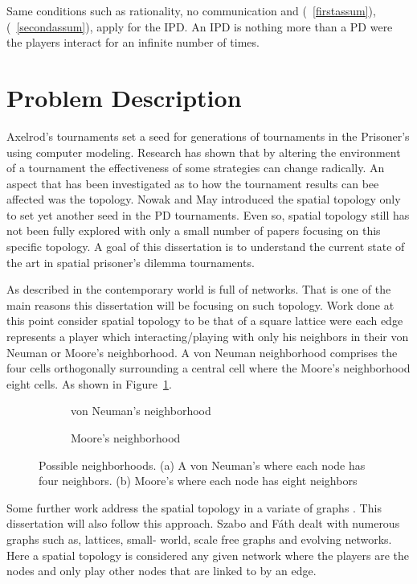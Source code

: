 Same conditions such as rationality, no communication and (~\ref{firstassum}),
(~\ref{secondassum}),
apply for the IPD. An IPD is nothing more than a PD were
the players interact for an infinite number of times.

\section{Problem Description}
Axelrod's tournaments set a seed for generations of tournaments in the
Prisoner's using computer modeling. Research has shown that by altering the
environment of a tournament the effectiveness of some strategies can change
radically. An aspect that has been investigated as to how the tournament results
can bee affected was the topology. Nowak and May \cite{Nowak1992} introduced the spatial topology
only to set yet another seed in the PD tournaments. Even so, spatial topology
still has not been fully explored with only a small number of papers focusing on
this specific topology.  A goal of this dissertation is to understand the
current state of the art in spatial prisoner’s dilemma tournaments.

As described in \cite{MacLane1971} the contemporary world is full of networks. That
is one of the main reasons this dissertation will be focusing on such topology.
Work done at this point consider spatial topology to be that of a square lattice
were each edge represents a player which interacting/playing with only his
neighbors in their von Neuman or Moore's neighborhood. A von Neuman neighborhood
comprises the four cells orthogonally surrounding a central cell where the
Moore's neighborhood eight cells. As shown in Figure~\ref{fig:neighborhood}.

\begin{figure}[!hbtp]
	\centering
	\begin{subfigure}[h]{0.45\textwidth}
		\centering
		
		\caption{von Neuman's neighborhood}
	\end{subfigure}
	\hfill
	\begin{subfigure}[h]{0.52\textwidth}\centering
		\centering
		
		\caption{Moore's neighborhood}
	\end{subfigure}
  \caption{Possible neighborhoods. (a) A von Neuman's where each node has four neighbors.
  (b) Moore's where each node has eight neighbors}
  \label{fig:neighborhood}
\end{figure}

Some further work address the spatial topology in a variate of graphs
\cite{Dresher1992a, Szabo2007, Lutz2013, Meng2015}.
This dissertation will also follow this approach. Szabo and Fáth dealt with
numerous graphs such as, lattices, small- world, scale free graphs and evolving
networks. Here a spatial topology is considered any given network where the
players are the nodes and only play other nodes that are linked to by
an edge.

